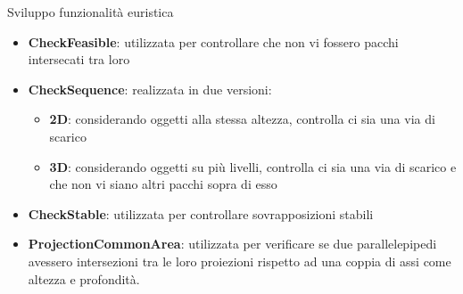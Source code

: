 \documentclass{beamer}
\begin{document}
\begin{frame}{Sviluppo funzionalit\`a euristica}
	\begin{itemize}
		\item \textbf{CheckFeasible}: utilizzata per controllare che non vi fossero pacchi intersecati tra loro
		\item \textbf{CheckSequence}: realizzata in due versioni:
			  \begin{itemize}
				  \item \textbf{2D}: considerando oggetti alla stessa altezza, controlla ci sia una via di scarico
				  \item \textbf{3D}: considerando oggetti su pi\`u livelli, controlla ci sia una via di scarico e che non vi siano altri pacchi sopra di esso
			  \end{itemize}
		\item \textbf{CheckStable}: utilizzata per controllare sovrapposizioni stabili
		\item \textbf{ProjectionCommonArea}: utilizzata per verificare se due parallelepipedi avessero intersezioni tra le loro proiezioni rispetto ad una coppia di assi come altezza e profondit\`a.	
	\end{itemize}
\end{frame}
\end{document}
